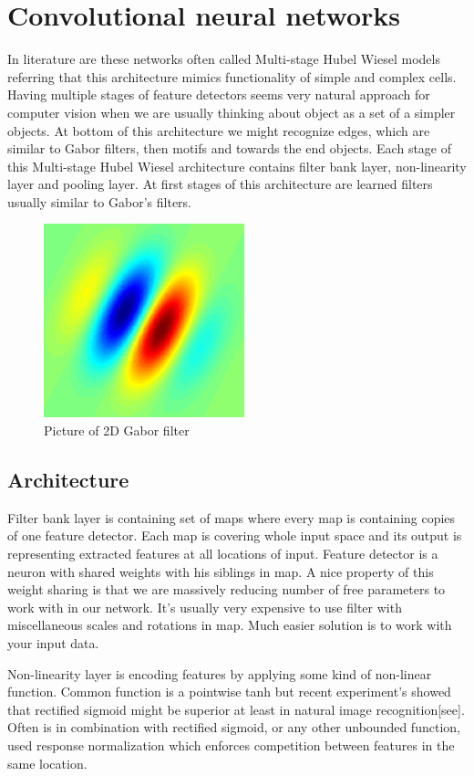 \chapter{Convolutional neural networks}
In literature are these networks often called Multi-stage Hubel Wiesel models referring that this architecture mimics functionality of simple and complex cells. Having multiple stages of feature detectors seems very natural approach for computer vision when we are usually thinking about object as a set of a simpler objects. At bottom of this architecture we might recognize edges, which are similar to Gabor filters, then motifs and towards the end objects. Each stage of this Multi-stage Hubel Wiesel architecture contains filter bank layer, non-linearity layer and pooling layer. At first stages of this architecture are learned filters usually similar to Gabor's filters.

\begin{figure}[h]
\centering
\includegraphics[scale=0.2]{./pictures/6.png}
\caption{Picture of 2D Gabor filter}
\end{figure}

\section{Architecture}
Filter bank layer is containing set of  maps where every map is containing copies of one feature detector. Each map is covering whole input space and its output is representing extracted features at all locations of input. Feature detector is a neuron with shared weights with his siblings in map. A nice property of this weight sharing is that we are massively reducing number of free parameters to work with in our network. It's usually very expensive to use filter with miscellaneous scales and rotations in map. Much easier solution is to work with your input data.

Non-linearity layer is encoding features by applying some kind of non-linear function. Common function is a pointwise tanh but recent experiment's showed that rectified sigmoid might be superior at least in natural image recognition[see]. Often is in combination with rectified sigmoid, or any other unbounded function, used response normalization which enforces competition between features in the same location.

